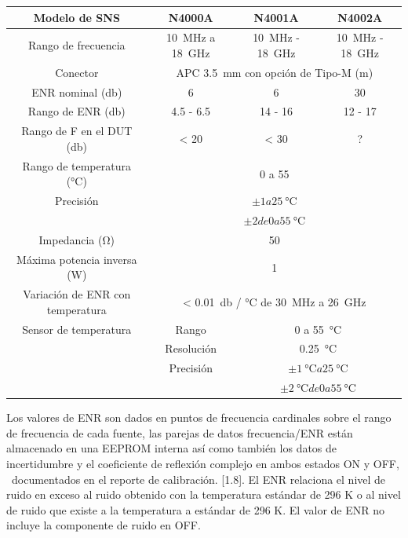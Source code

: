 	\begin{table}[h!]
		\centering
		\begin{tabular}{cccc}
			\toprule
			Modelo de SNS		&	N4000A		&	N4001A		&	N4002A	\\
			\midrule
			Rango de frecuencia	&	\SI{10}{\mega\hertz} a \SI{18}{\giga\hertz} & \SI{10}{\mega\hertz} - \SI{18}{\giga\hertz} & \SI{10}{\mega\hertz} - \SI{18}{\giga\hertz} \\
			\midrule
			Conector			&	\multicolumn{3}{c}{APC \SI{3.5}{\milli\meter} con opción de Tipo-M (m)}	\\
			\midrule
			ENR nominal	(\si{\decibel})		&	6 		&	6		&	30		\\
			\midrule
			Rango de ENR (\si{\decibel}) 	& 4.5 - 6.5 & 14 - 16	& 12 - 17 	\\
			\midrule
			Rango de F en el DUT (\si{\decibel}) & < 20		& < 30 		& 	?	 \\
			\midrule
			Rango de temperatura (\si{\degreeCelsius}) 	& \multicolumn{3}{c}{0 a 55} \\
			\midrule
			Precisión 				& \multicolumn{3}{c}{$\pm 1 a \SI{25}{\degreeCelsius}$} \\
									& \multicolumn{3}{c}{$\pm 2 de 0 a \SI{55}{\degreeCelsius}$} \\
			\midrule
			Impedancia (\si{\ohm})  & \multicolumn{3}{c}{ 50 } \\
			\midrule
			Máxima potencia inversa (\si{\watt}) 	& \multicolumn{3}{c}{1} \\
			\midrule
			Variación de ENR con temperatura 		& \multicolumn{3}{c}{ < \SI{0.01}{\decibel} / \si{\degreeCelsius} de \SI{30}{\mega\hertz} a \SI{26}{\giga\hertz}} \\
			\midrule
			Sensor de temperatura 	& Rango 		& \multicolumn{2}{c}{0 a \SI{55}{\degreeCelsius}} \\
									& Resolución 	& \multicolumn{2}{c}{\SI{0.25}{\degreeCelsius}} \\
									& Precisión 	& \multicolumn{2}{c}{$\pm \SI{1}{\degreeCelsius} a \SI{25}{\degreeCelsius}$} \\
									&				& \multicolumn{2}{c}{$\pm \SI{2}{\degreeCelsius} de 0 a \SI{55}{\degreeCelsius}$} \\ 
			\bottomrule									
		\end{tabular}
	\end{table}	
	


	Los valores de ENR son dados en puntos de frecuencia cardinales sobre el rango de frecuencia de cada fuente, las parejas de datos frecuencia/ENR están almacenado en una EEPROM interna así como también los datos de incertidumbre y el coeficiente de reflexión complejo en ambos estados ON y OFF, \ documentados en el reporte de calibración. [1.8]. El ENR relaciona el nivel de ruido en exceso al ruido obtenido con la temperatura estándar de 296 K o al nivel de ruido que existe a la temperatura a estándar de 296 K. El valor de ENR no incluye la componente de ruido en OFF. 
	
